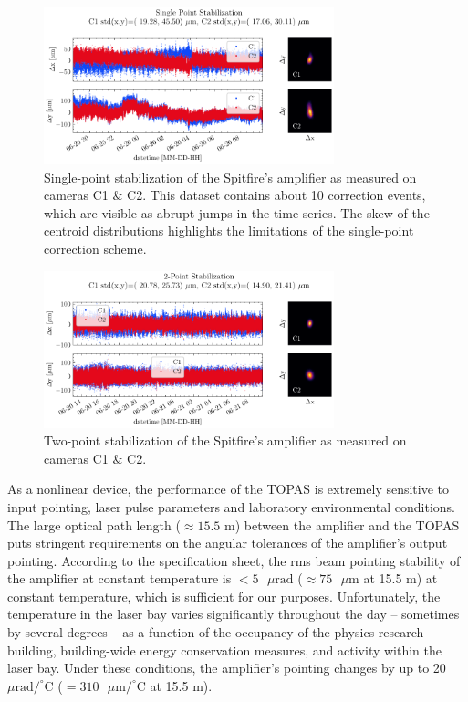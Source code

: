 \begin{figure}
	\centering
	\includegraphics[width=0.75\textwidth]{figures/chap2/Stability_Dietrich_ON.pdf}
	\caption{Single-point stabilization of the Spitfire's amplifier as measured on cameras C1 \& C2. This dataset contains about 10 correction events, which are visible as abrupt jumps in the time series. The skew of the centroid distributions highlights the limitations of the single-point correction scheme.}
	\label{fig:guidestar_1point_stability}
\end{figure}

\begin{figure}
	\centering
	\includegraphics[width=0.75\textwidth]{figures/chap2/Stability_GuideStarII_ON.pdf}
	\caption{Two-point stabilization of the Spitfire's amplifier as measured on cameras C1 \& C2.}
	\label{fig:guidestar_2point_stability}
\end{figure}

As a nonlinear device, the performance of the TOPAS is extremely sensitive to input pointing, laser pulse parameters and laboratory environmental conditions. The large optical path length ($\approx 15.5$ m) between the amplifier and the TOPAS puts stringent requirements on the angular tolerances of the amplifier's output pointing. According to the specification sheet, the rms beam pointing stability of the amplifier at constant temperature is $<5\text{ } \mu \text{rad}$ ($\approx 75 \text{ } \mu \text{m}$ at 15.5 m) at constant temperature, which is sufficient for our purposes. Unfortunately, the temperature in the laser bay varies significantly throughout the day -- sometimes by several degrees -- as a function of the occupancy of the physics research building, building-wide energy conservation measures, and activity within the laser bay. Under these conditions, the amplifier's pointing changes by up to 20 $\mu \text{rad} / ^{\circ} \text{C}$ ($= 310 \text{ } \mu \text{m}/ ^{\circ} \text{C}$ at 15.5 m).

